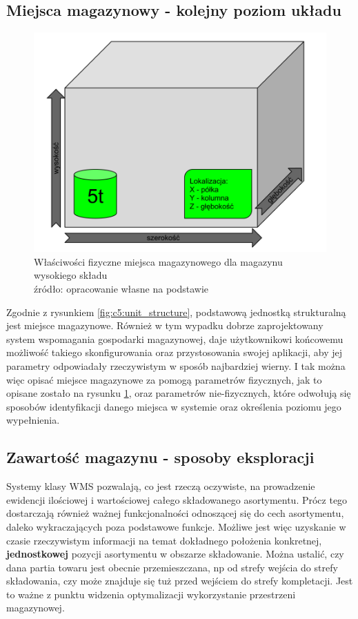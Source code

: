 	\subsection{Miejsca magazynowy - kolejny poziom układu}
		\begin{figure}[h]
			\centering
			\includegraphics[width=\textwidth]{images/storage_unit_description}
			\caption[Miejsce magazynowe - właściwości fizyczne]{
					Właściwości fizyczne miejsca magazynowego dla magazynu wysokiego składu \\
					źródło: opracowanie własne na podstawie \cite{IDL}
			}
			\label{fig:c5:storage_unit_description}
		\end{figure}
		Zgodnie z rysunkiem \ref{fig:c5:unit_structure}, podstawową jednostką strukturalną jest miejsce magazynowe.
		Również w tym wypadku dobrze zaprojektowany system wspomagania gospodarki magazynowej, daje 
		użytkownikowi końcowemu możliwość takiego skonfigurowania oraz przystosowania swojej aplikacji,
		aby jej parametry odpowiadały rzeczywistym w sposób najbardziej wierny. I tak można więc opisać miejsce 
		magazynowe za pomogą parametrów fizycznych, jak to opisane zostało na rysunku \ref{fig:c5:storage_unit_description},
		oraz parametrów nie-fizycznych, które odwołują się sposobów identyfikacji danego miejsca 
		w systemie oraz określenia poziomu jego wypełnienia. 
	\subsection{Zawartość magazynu - sposoby eksploracji}
		Systemy klasy WMS pozwalają, co jest rzeczą oczywiste, na prowadzenie ewidencji ilościowej i wartościowej całego
		składowanego asortymentu. Prócz tego dostarczają również ważnej funkcjonalności odnoszącej się do cech asortymentu,
		daleko wykraczających poza podstawowe funkcje. Możliwe jest więc uzyskanie w czasie rzeczywistym informacji na temat
		dokładnego położenia konkretnej, \textbf{jednostkowej} pozycji asortymentu w obszarze składowanie. Można 
		ustalić, czy dana partia towaru jest obecnie przemieszczana, np od strefy wejścia do strefy składowania, czy może
		znajduje się tuż przed wejściem do strefy kompletacji. Jest to ważne z punktu widzenia optymalizacji
		wykorzystanie przestrzeni magazynowej. \\
		
